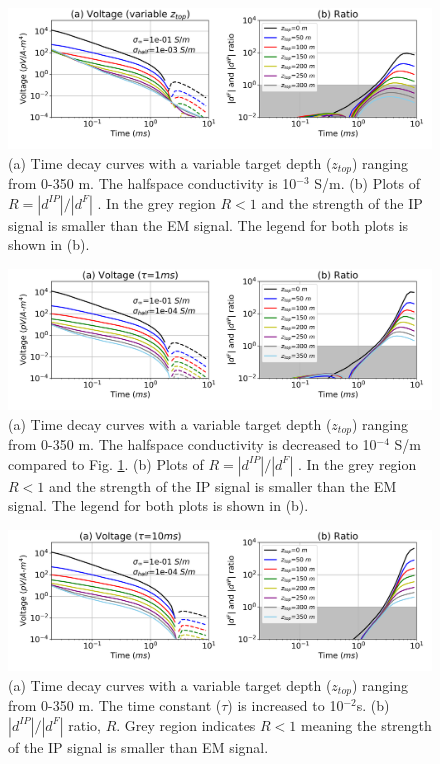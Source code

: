 \documentclass[manuscript]{geophysics}
\newcommand{\dip}{d^{IP}}
\begin{document}
\begin{figure}[htb]
  \centering
  \includegraphics[width=1.0\textwidth]{figures/data_depth_1}
  \caption{(a) Time decay curves with a variable target depth ($z_{top}$) ranging from 0-350 m. The halfspace conductivity is 10$^{-3}$ S/m. (b)  Plots of  $R=|\dip|/|d^F|$ . In the grey region $R<1$ and the strength of the IP signal is smaller than the EM signal. The legend for both plots is shown in (b).}
  \label{fig:7}
\end{figure}

\begin{figure}[htb]
  \centering
  \includegraphics[width=1.0\textwidth]{figures/data_depth_2}
  \caption{(a) Time decay curves with a variable target depth ($z_{top}$) ranging from 0-350 m.  The halfspace conductivity is decreased to 10$^{-4}$ S/m compared to Fig. \ref{fig:7}. (b)  Plots of  $R=|\dip|/|d^F|$ . In the grey region $R<1$ and the strength of the IP signal is smaller than the EM signal. The legend for both plots is shown in (b).}
  \label{fig:8}
\end{figure}

\begin{figure}[htb]
  \centering
  \includegraphics[width=1.0\textwidth]{figures/data_depth_tau}
  \caption{(a) Time decay curves with a variable target depth ($z_{top}$) ranging from 0-350 m.  The time constant ($\tau$) is increased to 10$^{-2}$s. (b) $|\dip|/|d^F|$ ratio, $R$. Grey region indicates $R<1$ meaning the strength of the IP signal is smaller than EM signal.}
  \label{fig:8-1}
\end{figure}
\end{document}
